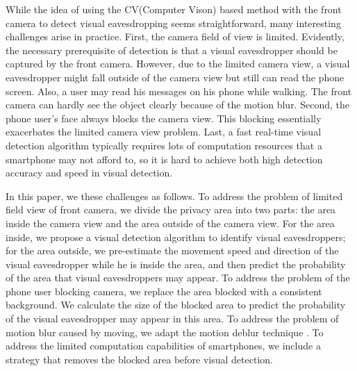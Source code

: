 While the idea of using the CV(Computer Vison) based method with the front camera to detect visual eavesdropping seems straightforward, many interesting challenges arise in practice.
First,  the camera field of view is limited.
Evidently, the necessary prerequisite of detection is that a visual eavesdropper should be captured by the front camera. However, due to the limited camera view, a visual eavesdropper might fall outside of the camera view but still can read the phone screen.
Also, a user may read his messages on his phone while walking. The front camera  can hardly see the object clearly because of the motion blur.
Second,  the phone user's face always blocks the camera view.  This blocking essentially exacerbates the limited camera view  problem.
Last, a fast real-time visual detection algorithm typically requires lots of computation resources that a smartphone may not afford to, so it is hard to achieve both high detection accuracy and speed in visual detection.

In this paper, we  these challenges as follows. %
To address the problem of limited field view of front camera, we divide the privacy area into two parts: the area inside the camera view and the area outside of the camera view. For the area inside, we propose a visual detection algorithm to identify visual eavesdroppers; for the area outside, we pre-estimate the movement speed and direction of the visual eavesdropper while he is inside the area, and then predict the probability of the area that  visual eavesdroppers may appear.
To address the problem of  the phone user blocking camera, we replace the area blocked with a consistent background. We calculate the size of the blocked area to predict the probability of the visual eavesdropper may appear in this area.
To address the problem of motion blur caused by moving, we adapt the motion deblur technique \cite{deblur}. To address the limited computation capabilities of smartphones, we include a strategy that removes the blocked area before visual detection.

